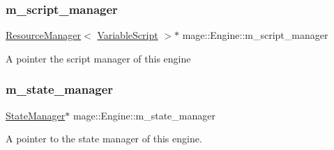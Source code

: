 \subsubsection{\texorpdfstring{m\+\_\+script\+\_\+manager}{m\_script\_manager}}
{\footnotesize\ttfamily \hyperlink{classmage_1_1_resource_manager}{Resource\+Manager}$<$ \hyperlink{classmage_1_1_variable_script}{Variable\+Script} $>$$\ast$ mage\+::\+Engine\+::m\+\_\+script\+\_\+manager\hspace{0.3cm}{\ttfamily [private]}}

A pointer the script manager of this engine \hypertarget{classmage_1_1_engine_a7a0c463c67c3375b896809be9046113d}{}\label{classmage_1_1_engine_a7a0c463c67c3375b896809be9046113d} 
\subsubsection{\texorpdfstring{m\+\_\+state\+\_\+manager}{m\_state\_manager}}
{\footnotesize\ttfamily \hyperlink{classmage_1_1_state_manager}{State\+Manager}$\ast$ mage\+::\+Engine\+::m\+\_\+state\+\_\+manager\hspace{0.3cm}{\ttfamily [private]}}

A pointer to the state manager of this engine. 